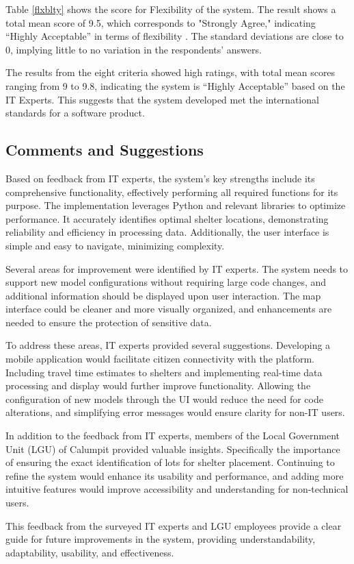 	Table \ref{flxblty} shows the score for Flexibility of the system. The result shows a total mean score of 9.5, which corresponds to "Strongly Agree," indicating “Highly Acceptable” in terms of flexibility . The standard deviations are close to 0, implying little to no variation in the respondents’ answers.
	
	The results from the eight criteria showed high ratings, with total mean scores ranging from 9 to 9.8, indicating the system is “Highly Acceptable” based on the IT Experts. This suggests that the system developed met the international standards for a software product.

\subsection{Comments and Suggestions}
	Based on feedback from IT experts, the system's key strengths include its comprehensive functionality, effectively performing all required functions for its purpose. The implementation leverages Python and relevant libraries to optimize performance. It accurately identifies optimal shelter locations, demonstrating reliability and efficiency in processing data. Additionally, the user interface is simple and easy to navigate, minimizing complexity.
	
	Several areas for improvement were identified by IT experts. The system needs to support new model configurations without requiring large code changes, and additional information should be displayed upon user interaction. The map interface could be cleaner and more visually organized, and enhancements are needed to ensure the protection of sensitive data.
	
	To address these areas, IT experts provided several suggestions. Developing a mobile application would facilitate citizen connectivity with the platform. Including travel time estimates to shelters and implementing real-time data processing and display would further improve functionality. Allowing the configuration of new models through the UI would reduce the need for code alterations, and simplifying error messages would ensure clarity for non-IT users.

	In addition to the feedback from IT experts, members of the Local Government Unit (LGU) of Calumpit provided valuable insights. Specifically the importance of ensuring the exact identification of lots for shelter placement. Continuing to refine the system would enhance its usability and performance, and adding more intuitive features would improve accessibility and understanding for non-technical users.
	
	This feedback from the surveyed IT experts and LGU employees provide a clear guide for future improvements in the system, providing understandability, adaptability, usability, and effectiveness.
	
